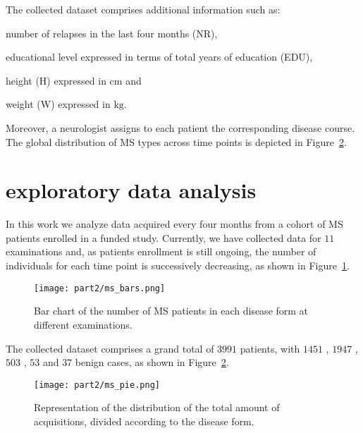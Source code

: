 The collected \PCO dataset comprises additional information such as:
\begin{enumerate*}[label=\roman*)]
	\item number of relapses in the last four months (NR),
	\item educational level expressed in terms of total years of education (EDU),
	\item height (H) expressed in $\text{cm}$ and
	\item weight (W) expressed in $\text{kg}$.
\end{enumerate*}
Moreover, a neurologist assigns to each patient the corresponding disease course. The global distribution of MS types across time points is depicted in Figure~\ref{fig:PPRRSP}.


\section{\PCOs exploratory data analysis} \label{sec:aism_eda}


In this work we analyze \PCOs data acquired every four months from a cohort of MS patients enrolled in a funded study.
Currently, we have collected data for $11$ examinations and, as patients enrollment is still ongoing,  the number of individuals for each time point is successively decreasing, as shown in Figure~\ref{fig:patients}.
\begin{figure}[]
	\centering
	\texttt{[image: part2/ms\_bars.png]}
	\caption{Bar chart of the number of MS patients in each disease form  at different examinations.} \label{fig:patients}
\end{figure}

The collected dataset comprises a grand total of $3991$ patients, with $1451$ \RR, $1947$ \SP, $503$ \PP, $53$ \PR and $37$ benign cases, as shown in Figure~\ref{fig:PPRRSP}.
\begin{figure}[]
	\centering
	\texttt{[image: part2/ms\_pie.png]}
	\caption{Representation of the distribution of the total amount of acquisitions, divided according to the disease form.} \label{fig:PPRRSP}
\end{figure}

